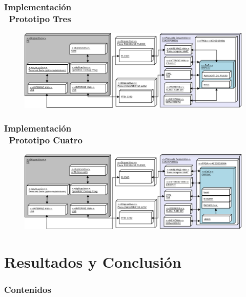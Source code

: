 \documentclass[xcolor=dvipsnames,mathserif,9pt]{beamer}
\begin{document}
\begin{frame} \frametitle{Implementación\\ \ Prototipo Tres}
 \begin{figure}[!h]
      \centering
     \includegraphics[scale=0.09]{figuras/ecos}
    \end{figure}
\end{frame}

\begin{frame} \frametitle{Implementación\\ \ Prototipo Cuatro}
 \begin{figure}[!h]
      \centering
     \includegraphics[scale=0.09]{figuras/proto4}
    \end{figure}
\end{frame}

  \section{Resultados y Conclusión}
  \begin{frame}
    \frametitle{Contenidos}
    \tableofcontents[currentsection]
  \end{frame}
\end{document}
